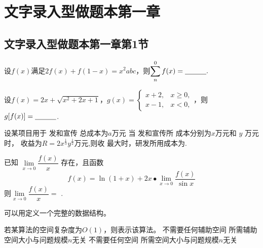 \documentclass[standard]{ExBook}
\begin{document}


\maketitle 
 
 



\setcounter{page}{1}
\tableofcontents 
    
\clearpage 

\section{文字录入型做题本第一章}
\subsection{文字录入型做题本第一章第1节}

\begin{qitems}

    \begin{bbox}
        \qitem 设$f(x)$满足$2f(x)+f(1-x)=x^2 abc$，则$ \displaystyle\sum \limits_{n}^{0}f(x)=\underline{\hspace{3em}}.$
    \end{bbox}

    \begin{bbox}
        \qitem[][]   设$f(x)=2x+\sqrt{x^{2}+2x+1}$，$g(x)=
        \begin{cases}
        x+2, & x\geqslant0, \\
        x-1, & x<0,  
        \end{cases}$，则$g[f(x)]= \underline{\hspace{3em}}$.
    \end{bbox}

    \begin{bbox}
        \qitem   设某项目用于 发和宣传 总成本为$a$万元 当 发和宣传所 成本分别为$x$万元和 $y$ 万元时， 收益为$R=2x^{\frac{1}{3}}y^{\frac{1}{2}}$万元,则收 最大时，研发所用成本为\blankline.
    \end{bbox}

    \begin{bbox}
        \qitem   已知 $\lim\limits_{x\to0}\dfrac{f(x)}{x}$ 存在，且函数
        $$f(x)=\ln(1+x)+2x\bullet\lim_{x\to0}\frac{f(x)}{\sin x}$$
        则$\lim\limits_{x\to0}\dfrac{f(x)}{x}=$ \blankline.
    \end{bbox}

    \begin{bbox}
        \qitem  可以用\blankbox 定义一个完整的数据结构。\textwater
    \end{bbox}

    \begin{bbox}
        \qitem   若某算法的空间复杂度为$O(1)$，则表示该算法\blankbox 。
        \fourchoices
        {不需要任何辅助空间}
        {所需辅助空间大小与问题规模$n$无关}
        {不需要任何空间}
        {所需空间大小与问题规模$n$无关}
    \end{bbox}
\end{qitems}
\end{document}
